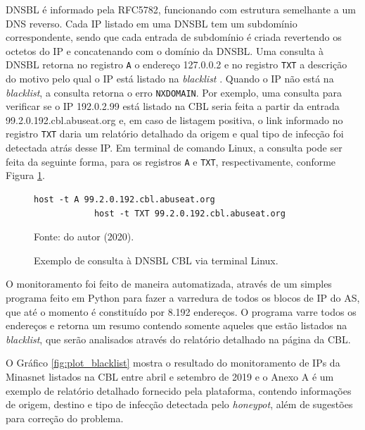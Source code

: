     DNSBL é informado pela RFC5782, funcionando com estrutura semelhante a um DNS reverso. Cada IP listado em uma DNSBL tem um subdomínio correspondente, sendo que cada entrada de subdomínio é criada revertendo os octetos do IP e concatenando com o domínio da DNSBL. Uma consulta à DNSBL retorna no registro {\tt A} o endereço 127.0.0.2 e no registro {\tt TXT} a descrição do motivo pelo qual o IP está listado na \textit{blacklist} \cite{rfc5782}. Quando o IP não está na \textit{blacklist}, a consulta retorna o erro {\tt NXDOMAIN}. Por exemplo, uma consulta para verificar se o IP 192.0.2.99 está listado na CBL seria feita a partir da entrada 99.2.0.192.cbl.abuseat.org e, em caso de listagem positiva, o link informado no registro {\tt TXT} daria um relatório detalhado da origem e qual tipo de infecção foi detectada atrás desse IP. Em terminal de comando Linux, a consulta pode ser feita da seguinte forma, para os registros {\tt A} e {\tt TXT}, respectivamente, conforme Figura \ref{fig:dnsbl_query}.
    
    \begin{figure}[!htb]
        \centering
        \caption{Exemplo de consulta à DNSBL CBL via terminal Linux.} 
        \label{fig:dnsbl_query}
        
        \begin{Verbatim}[fontsize=\normalsize]
            host -t A 99.2.0.192.cbl.abuseat.org
            host -t TXT 99.2.0.192.cbl.abuseat.org
        \end{Verbatim} 

        {\small Fonte: do autor (2020).} 
    \end{figure}
    
    O monitoramento foi feito de maneira automatizada, através de um simples programa feito em Python para fazer a varredura de todos os blocos de IP do AS, que até o momento é constituído por 8.192 endereços. O programa varre todos os endereços e retorna um resumo contendo somente aqueles que estão listados na \textit{blacklist}, que serão analisados através do relatório detalhado na página da CBL.
    
    O Gráfico \ref{fig:plot_blacklist} mostra o resultado do monitoramento de IPs da Minasnet listados na CBL entre abril e setembro de 2019 e o Anexo A é um exemplo de relatório detalhado fornecido pela plataforma, contendo informações de origem, destino e tipo de infecção detectada pelo \textit{honeypot}, além de sugestões para correção do problema.
    
